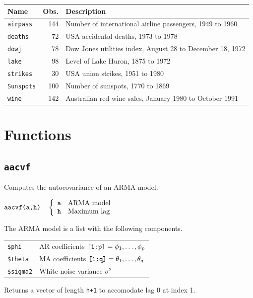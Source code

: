\documentclass[12pt]{article}
\begin{document}
\begin{center}
\begin{tabular}{|l|r|l|}
\hline
Name & Obs. & Description\\
\hline
{\tt airpass} & 144 & Number of international airline passengers, 1949 to 1960\\
{\tt deaths} & 72 & USA accidental deaths, 1973 to 1978\\
{\tt dowj} & 78 & Dow Jones utilities index, August 28 to December 18, 1972\\
{\tt lake} & 98 & Level of Lake Huron, 1875 to 1972\\
{\tt strikes} & 30 & USA union strikes, 1951 to 1980\\
{\tt Sunspots} & 100 & Number of sunspots, 1770 to 1869\\
{\tt wine} & 142 & Australian red wine sales, January 1980 to October 1991\\
\hline
\end{tabular}
\end{center}

\newpage

\section{Functions}

\subsection{\tt aacvf}
Computes the autocovariance of an ARMA model.

\bigskip
$
\hbox{\tt aacvf(a,h)}\quad\left\{\begin{array}{ll}
{\tt a} & \hbox{ARMA model}\\
{\tt h} & \hbox{Maximum lag}
\end{array}\right.
$

\bigskip
\noindent
The ARMA model is a list with the following components.

\begin{center}
\begin{tabular}{ll}
{\tt \$phi} & AR coefficients $\hbox{\tt[1:p]}=\phi_1,\ldots,\phi_p$\\
{\tt \$theta} & MA coefficients $\hbox{\tt[1:q]}=\theta_1,\ldots,\theta_q$\\
{\tt \$sigma2} & White noise variance $\sigma^2$
\end{tabular}
\end{center}

\noindent
Returns a vector of length {\tt h+1} to accomodate lag 0 at index 1.
\end{document}
